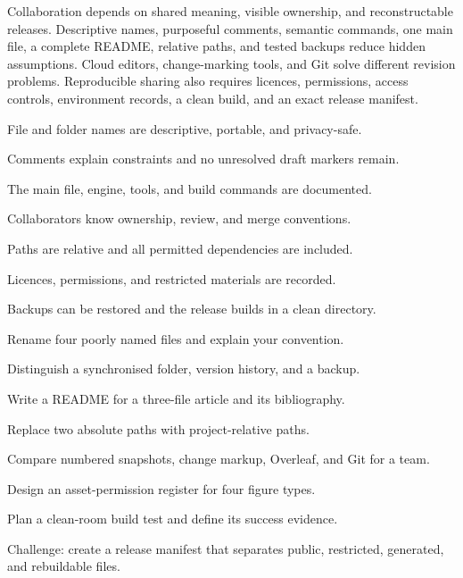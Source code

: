 \chaptersummary

Collaboration depends on shared meaning, visible ownership, and reconstructable
releases. Descriptive names, purposeful comments, semantic commands, one main
file, a complete README, relative paths, and tested backups reduce hidden
assumptions. Cloud editors, change-marking tools, and Git solve different
revision problems. Reproducible sharing also requires licences, permissions,
access controls, environment records, a clean build, and an exact release
manifest.

\chaptercheck
\begin{chapterchecklist}
  \item File and folder names are descriptive, portable, and privacy-safe.
  \item Comments explain constraints and no unresolved draft markers remain.
  \item The main file, engine, tools, and build commands are documented.
  \item Collaborators know ownership, review, and merge conventions.
  \item Paths are relative and all permitted dependencies are included.
  \item Licences, permissions, and restricted materials are recorded.
  \item Backups can be restored and the release builds in a clean directory.
\end{chapterchecklist}

\chapterexercisestitle
\begin{chapterexercises}
  \item Rename four poorly named files and explain your convention.
  \item Distinguish a synchronised folder, version history, and a backup.
  \item Write a README for a three-file article and its bibliography.
  \item Replace two absolute paths with project-relative paths.
  \item Compare numbered snapshots, change markup, Overleaf, and Git for a team.
  \item Design an asset-permission register for four figure types.
  \item Plan a clean-room build test and define its success evidence.
  \item Challenge: create a release manifest that separates public, restricted,
        generated, and rebuildable files.
\end{chapterexercises}
